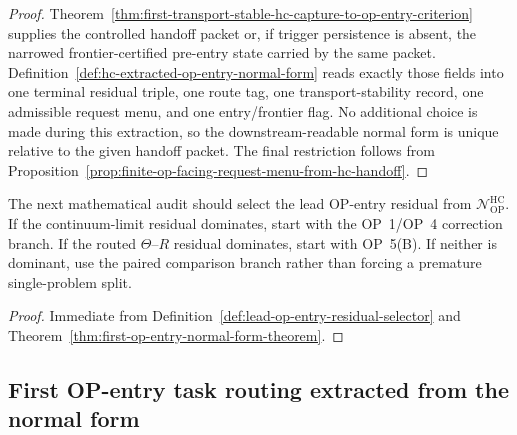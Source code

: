 \begin{proof}
Theorem~\ref{thm:first-transport-stable-hc-capture-to-op-entry-criterion} supplies the controlled handoff packet or, if trigger persistence is absent, the narrowed frontier-certified pre-entry state carried by the same packet.  Definition~\ref{def:hc-extracted-op-entry-normal-form} reads exactly those fields into one terminal residual triple, one route tag, one transport-stability record, one admissible request menu, and one entry/frontier flag.  No additional choice is made during this extraction, so the downstream-readable normal form is unique relative to the given handoff packet.  The final restriction follows from Proposition~\ref{prop:finite-op-facing-request-menu-from-hc-handoff}.
\end{proof}

\begin{corollary}
\label{cor:v3340-r02-working-rule}
The next mathematical audit should select the lead OP-entry residual from $\mathcal N_{\mathrm{OP}}^{\mathrm{HC}}$.  If the continuum-limit residual dominates, start with the OP~1/OP~4 correction branch.  If the routed $\Theta$--$R$ residual dominates, start with OP~5(B).  If neither is dominant, use the paired comparison branch rather than forcing a premature single-problem split.
\end{corollary}

\begin{proof}
Immediate from Definition~\ref{def:lead-op-entry-residual-selector} and Theorem~\ref{thm:first-op-entry-normal-form-theorem}.
\end{proof}

\subsection{First OP-entry task routing extracted from the normal form}
\label{subsec:first-op-entry-task-routing-extracted-from-normal-form}

